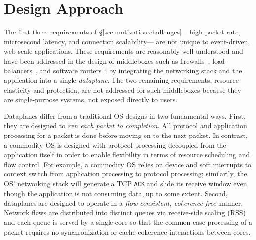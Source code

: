 \section{\ix Design Approach}
\label{sec:design}


The first three requirements of \S\ref{sec:motivation:challenges} --
high packet rate, microsecond latency, and connection scalability---
are not unique to event-driven, web-scale applications.  These
requirements are reasonably well understood and have been addressed in
the design of middleboxes such as firewalls~\cite{missing},
load-balancers~\cite{missing}, and software
routers~\cite{DBLP:journals/tocs/KohlerMCJK00,DBLP:conf/sosp/DobrescuEACFIKMR09};
by integrating the networking stack and the application into a single
\emph{dataplane}. The two remaining requirements, resource elasticity
and protection, are not addressed for such middleboxes because they
are single-purpose systems, not exposed directly to users. 


Dataplanes differ from a traditional OS designs in two fundamental
ways. First, they are designed to \emph{run each packet to
  completion}. All protocol and application processing for a packet is
done before moving on to the next packet.  In contrast, a commodity OS is designed
with protocol processing decoupled from the application itself in
order to enable flexibility in terms of resource scheduling and flow
control. For example, a commodity OS relies on device and soft interrupts to context switch from application processing to protocol processing; 
similarily, the OS' networking stack will generate a TCP \texttt{ACK} and
slide its receive window even though the application is not consuming
data, up to some extent. Second, dataplanes are designed to operate in
a \emph{flow-consistent, coherence-free} manner.
Network flows are distributed into distinct queues via receive-side
scaling (RSS)~\cite{DBLP:journals/computer/RegnierMIIMHNCF04} and each queue
is served by a single core so that the common case processing of a
packet requires no synchronization or cache coherence interactions
between cores.

